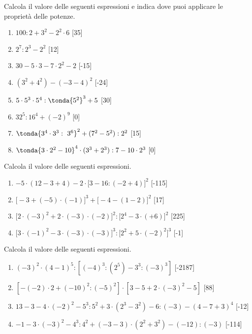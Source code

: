 \begin{esercizio} %
Calcola il valore delle seguenti espressioni e indica dove puoi applicare le 
proprietà delle potenze.

\vspace{-.5em}
\begin{multicols}{2}
\begin{enumerate}[noitemsep, label=(\alph*)]
 \item \(100:2+3^2 -2^2\cdot 6\) \hfill[35]
 \item \(2^7:2^3 -2^2\) \hfill[12]
 \item \(30-5\cdot 3 -7\cdot 2^2 -2\) \hfill[-15]
 \item \((3^2 +4^2) -(-3-4)^2\) \hfill[-24]
 \item \(5\cdot 5^3\cdot 5^4: \tonda{5^2 }^3 +5\) \hfill[30]
 \item \(32^5:16^4 +(-2)^9\) \hfill[0]
 \item \(\tonda{3^4\cdot 3^3:~3^6 }^2 +(7^2-5^2):2^2\) \hfill[15]
 \item \(\tonda{3\cdot 2^2 -10 }^4\cdot (3^3+2^3):7-10\cdot 2^3\) \hfill[0]
\end{enumerate}
\end{multicols}
\end{esercizio}

\begin{esercizio} %
Calcola il valore delle seguenti espressioni.
 \begin{enumerate}[noitemsep, label=(\alph*)]
 \item \(-5\cdot(12-3+4)-2\cdot\big[3-16:(-2+4)\big]^2\) \hfill[-115]
 \item \(\big[-3+(-5)\cdot(-1)\big]^3+\big[-4-(1-2)\big]^2\) \hfill[17]
 \item 
\(\big[2\cdot(-3)^2+2\cdot(-3)\cdot(-2)\big]^2:\big[2^4-3\cdot(+6)\big]^2\)
 \hfill[225]
 \item 
\(\big[3\cdot(-1)^2-3\cdot(-3)\cdot(-3)\big]^3:\big[2^2+5\cdot(-2)^2\big]^3\)
 \hfill[-1]
 \end{enumerate}
\end{esercizio}

\begin{esercizio} %
Calcola il valore delle seguenti espressioni.
 \begin{enumerate}[noitemsep, label=(\alph*)]
 \item \((-3)^2\cdot(4-1)^5:[(-4)^3:(2^5)-3^3:(-3)^3]\) \hfill[-2187]
 \item \([-(-2)\cdot2+(-10)^2:(-5)^2]\cdot[3-5+2\cdot(-3)^2-5]\) \hfill[88]
 \item \(13-3-4\cdot(-2)^2-5^3:5^2+3\cdot(2^3-3^2)-6:(-3)-(4-7+3)^4\)
  \hfill[-12]
 \item \(-1-3\cdot(-3)^2-4^3:4^2+(-3-3)\cdot(2^2+3^2)-(-12):(-3)\) 
\hfill[-114]
 \end{enumerate}
\end{esercizio}

